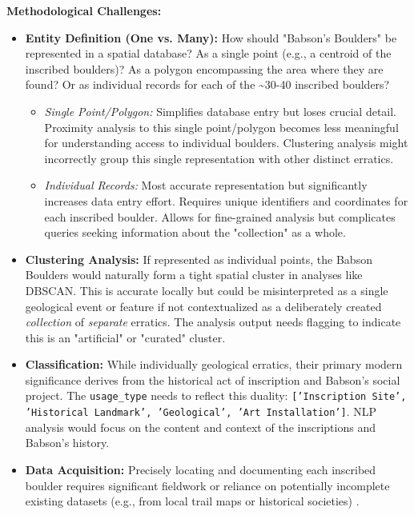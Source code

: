 \documentclass[
11pt, %
english, %
singlespacing, %
headsepline, %
]{MastersDoctoralThesis} %
\begin{document}
\textbf{Methodological Challenges:}
\begin{itemize}
    \item \textbf{Entity Definition (One vs. Many):} How should "Babson's Boulders" be represented in a spatial database? As a single point (e.g., a centroid of the inscribed boulders)? As a polygon encompassing the area where they are found? Or as individual records for each of the \textasciitilde30-40 inscribed boulders?
        \begin{itemize}
            \item \emph{Single Point/Polygon:} Simplifies database entry but loses crucial detail. Proximity analysis to this single point/polygon becomes less meaningful for understanding access to individual boulders. Clustering analysis might incorrectly group this single representation with other distinct erratics.
            \item \emph{Individual Records:} Most accurate representation but significantly increases data entry effort. Requires unique identifiers and coordinates for each inscribed boulder. Allows for fine-grained analysis but complicates queries seeking information about the "collection" as a whole.
        \end{itemize}
    \item \textbf{Clustering Analysis:} If represented as individual points, the Babson Boulders would naturally form a tight spatial cluster in analyses like DBSCAN. This is accurate locally but could be misinterpreted as a single geological event or feature if not contextualized as a deliberately created \emph{collection} of \emph{separate} erratics. The analysis output needs flagging to indicate this is an "artificial" or "curated" cluster.
    \item \textbf{Classification:} While individually geological erratics, their primary modern significance derives from the historical act of inscription and Babson's social project. The \texttt{usage\_type} needs to reflect this duality: \texttt{['Inscription Site', 'Historical Landmark', 'Geological', 'Art Installation']}. NLP analysis would focus on the content and context of the inscriptions and Babson's history.
    \item \textbf{Data Acquisition:} Precisely locating and documenting each inscribed boulder requires significant fieldwork or reliance on potentially incomplete existing datasets (e.g., from local trail maps or historical societies) \cite{wburMysteriousBoulders}.
\end{itemize}
\end{document}
